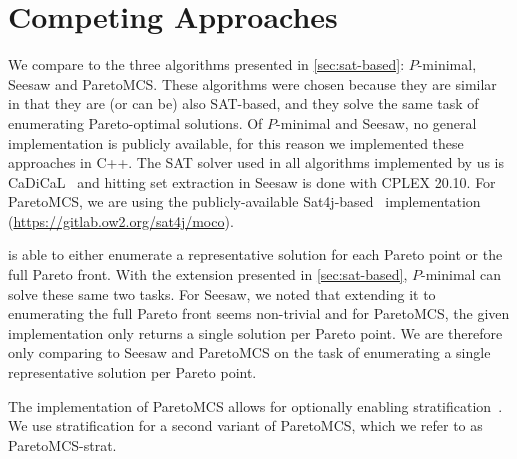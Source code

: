 \section{Competing Approaches\label{sec:competing}}

We compare \algname{} to the three algorithms presented in \cref{sec:sat-based}: $P$-minimal, Seesaw and ParetoMCS.
These algorithms were chosen because they are similar in that they are (or can be) also SAT-based, and they solve the same task of enumerating Pareto-optimal solutions.
Of $P$-minimal and Seesaw, no general implementation is publicly available, for this reason we implemented these approaches in C++.
The SAT solver used in all algorithms implemented by us is CaDiCaL~\autocite{BiereFazekasFleuryHeisinger-SAT-Competition-2020-solvers} and hitting set extraction in Seesaw is done with CPLEX 20.10.
For ParetoMCS, we are using the publicly-available Sat4j-based~\autocite{DBLP:journals/jsat/BerreP10} implementation ({\small\url{https://gitlab.ow2.org/sat4j/moco}}).

\algname{} is able to either enumerate a representative solution for each Pareto point or the full Pareto front.
With the extension presented in \cref{sec:sat-based}, $P$-minimal can solve these same two tasks.
For Seesaw, we noted that extending it to enumerating the full Pareto front seems non-trivial and for ParetoMCS, the given implementation only returns a single solution per Pareto point.
We are therefore only comparing to Seesaw and ParetoMCS on the task of enumerating a single representative solution per Pareto point.

The implementation of ParetoMCS allows for optionally enabling stratification~\autocite{DBLP:conf/ijcai/Terra-NevesLM18}.
We use stratification for a second variant of ParetoMCS, which we refer to as ParetoMCS-strat.

